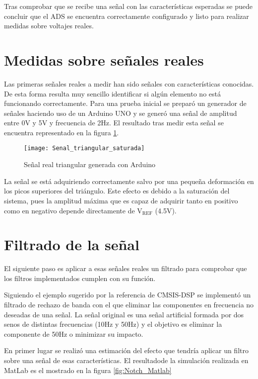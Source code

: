 Tras comprobar que se recibe una señal con las características esperadas se puede concluir que el ADS se encuentra correctamente configurado y listo para realizar medidas sobre voltajes reales.

\section{Medidas sobre señales reales\label{Resultados_Medida_Real}}

Las primeras señales reales a medir han sido señales con características conocidas. De esta forma resulta muy sencillo identificar si algún elemento no está funcionando correctamente. Para una prueba inicial se preparó un generador de señales haciendo uso de un Arduino UNO y se generó una señal de amplitud entre 0V y 5V y frecuencia de 2Hz. El resultado tras medir esta señal se encuentra representado en la figura \ref{fig:Senal_triangular_saturada}.

\begin{figure} [H]
    \centering
    \texttt{[image: Senal\_triangular\_saturada]}
    \caption{Señal real triangular generada con Arduino}
    \label{fig:Senal_triangular_saturada}
\end{figure}

La señal se está adquiriendo correctamente salvo por una pequeña deformación en los picos superiores del triángulo. Este efecto es debido a la saturación del sistema, pues la amplitud máxima que es capaz de adquirir tanto en positivo como en negativo depende directamente de V$_{\text{REF}}$ (4.5V).

\clearpage

\section{Filtrado de la señal\label{Resultados_filtrado}}

El siguiente paso es aplicar a esas señales reales un filtrado para comprobar que los filtros implementados cumplen con su función.

Siguiendo el ejemplo sugerido por la referencia de CMSIS-DSP se implementó un filtrado de rechazo de banda con el que eliminar las componentes en frecuencia no deseadas de una señal. La señal original es una señal artificial formada por dos senos de distintas frecuencias (10Hz y 50Hz) y el objetivo es eliminar la componente de 50Hz o minimizar su impacto. 

En primer lugar se realizó una estimación del efecto que tendría aplicar un filtro sobre una señal de esas características. El resultadode la simulación realizada en MatLab es el mostrado en la figura \ref{fig:Notch_Matlab}

